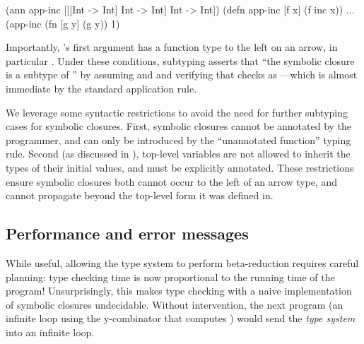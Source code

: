 \begin{cljlisting}
(ann app-inc [[[Int -> Int] Int -> Int] Int -> Int])
(defn app-inc [f x] (f inc x))
...
(app-inc (fn [g y] (g y)) 1)
\end{cljlisting}

Importantly, 's first argument has a function
type to the left on an arrow, in particular .
Under these conditions, subtyping asserts that ``the symbolic
closure  is a subtype of ''
by assuming  and  and
verifying that  checks as ---which is almost immediate by
the standard application rule.

We leverage some syntactic restrictions
to avoid the need for further subtyping cases for symbolic closures.
First, symbolic closures cannot be annotated by the programmer,
and can only be introduced by the ``unannotated function'' typing rule.
Second (as discussed in ),
top-level variables are not allowed to inherit the types of their initial
values, and must be explicitly annotated.
These restrictions ensure symbolic closures both cannot occur to the
left of an arrow type, and 
cannot propagate beyond the top-level form it was defined in.

\subsection{Performance and error messages}


While useful, allowing the type system to perform beta-reduction
requires careful planning: type checking time is now proportional 
to the running time of the program!
Unsurprisingly, this makes type checking with a naive implementation of symbolic
closures undecidable.
Without intervention,
the next program (an infinite loop using the y-combinator that computes )
would send the \emph{type system} into an infinite loop.



